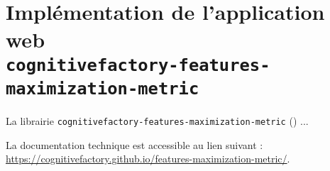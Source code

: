 \section[
		\texttt{cognitivefactory-features-maximization-metric}
	]{
		Implémentation de l'application web \\ \texttt{cognitivefactory-features-maximization-metric}
	}
\label{annex:C.3-DESCRIPTION-IMPLEMENTATION-FEATURES-MAXIMIZATION-METRIC}
	
	La librairie \texttt{cognitivefactory-features-maximization-metric} (\cite{schild:2023:cognitivefactory-featuresmaximizationmetric}) ...
	
	\begin{leftBarInformation}
		La documentation technique est accessible au lien suivant : \url{https://cognitivefactory.github.io/features-maximization-metric/}.
	\end{leftBarInformation}